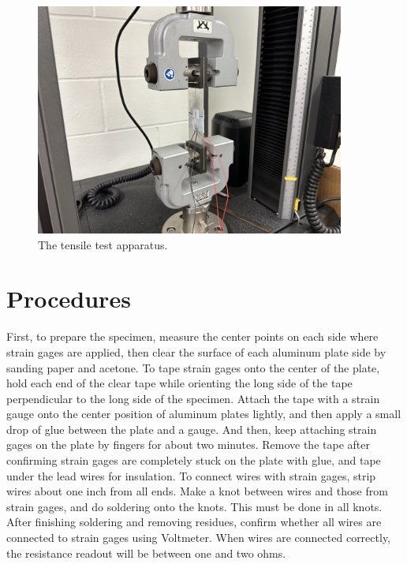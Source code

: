 \documentclass[12 pt]{report}
\begin{document}
\begin{figure}[htbp]
	\centering
	\includegraphics[width=4in]{images/IMG_1073}
	\caption{The tensile test apparatus.}
	\label{fig:tensile_pic}
\end{figure}

\section{Procedures} \label{sec:procedures}
First, to prepare the specimen, measure the center points on each side where strain gages are applied, then clear the surface of each aluminum plate side by sanding paper and acetone. To tape strain gages onto the center of the plate, hold each end of the clear tape while orienting the long side of the tape perpendicular to the long side of the specimen. Attach the tape with a strain gauge onto the center position of aluminum plates lightly, and then apply a small drop of glue between the plate and a gauge. And then, keep attaching strain gages on the plate by fingers for about two minutes. Remove the tape after confirming strain gages are completely stuck on the plate with glue, and tape under the lead wires for insulation. To connect wires with strain gages, strip wires about one inch from all ends. Make a knot between wires and those from strain gages, and do soldering onto the knots. This must be done in all knots. After finishing soldering and removing residues, confirm whether all wires are connected to strain gages using Voltmeter. When wires are connected correctly, the resistance readout will be between one and two ohms.      
\end{document}
